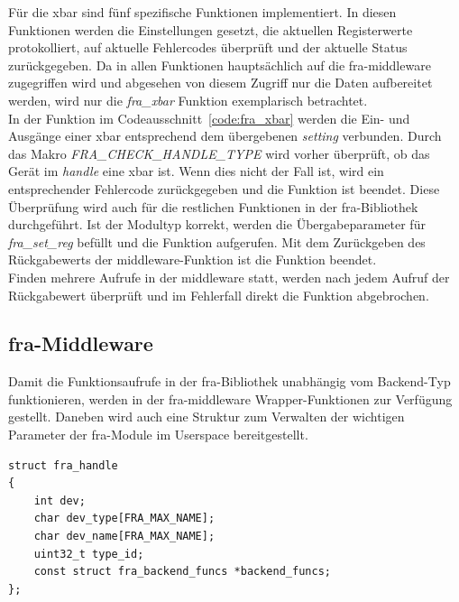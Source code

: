 Für die \ac{xbar} sind fünf spezifische Funktionen implementiert. In diesen Funktionen werden die Einstellungen gesetzt, die aktuellen Registerwerte protokolliert, auf aktuelle Fehlercodes überprüft und der aktuelle Status zurückgegeben. Da in allen Funktionen hauptsächlich auf die \ac{fra}-\gls{middleware} zugegriffen wird und abgesehen von diesem Zugriff nur die Daten aufbereitet werden, wird nur die \textit{fra\_xbar} Funktion exemplarisch betrachtet.\\

In der Funktion im Codeausschnitt~\ref{code:fra_xbar} werden die Ein- und Ausgänge einer \ac{xbar} entsprechend dem übergebenen \textit{setting} verbunden.
Durch das Makro \textit{FRA\_CHECK\_HANDLE\_TYPE} wird vorher überprüft, ob das Gerät im \textit{handle} eine \ac{xbar} ist. Wenn dies nicht der Fall ist, wird ein entsprechender Fehlercode zurückgegeben und die Funktion ist beendet. Diese Überprüfung wird auch für die restlichen Funktionen in der \ac{fra}-Bibliothek durchgeführt.
Ist der Modultyp korrekt, werden die Übergabeparameter für \textit{fra\_set\_reg} befüllt und die Funktion aufgerufen. Mit dem Zurückgeben des Rückgabewerts der \gls{middleware}-Funktion ist die Funktion beendet.\\

Finden mehrere Aufrufe in der \gls{middleware} statt, werden nach jedem Aufruf der Rückgabewert überprüft und im Fehlerfall direkt die Funktion abgebrochen.


\subsection{\acs{fra}-Middleware}\label{sec:middleware}
Damit die Funktionsaufrufe in der \ac{fra}-Bibliothek unabhängig vom Backend-Typ funktionieren, werden in der \ac{fra}-\gls{middleware} Wrapper-Funktionen zur Verfügung gestellt. Daneben wird auch eine Struktur zum Verwalten der wichtigen Parameter der \ac{fra}-Module im Userspace bereitgestellt.


\begin{lstfloat}
\begin{lstlisting}
struct fra_handle
{
	int dev;
	char dev_type[FRA_MAX_NAME];
	char dev_name[FRA_MAX_NAME];
	uint32_t type_id;
	const struct fra_backend_funcs *backend_funcs;
};
\end{lstlisting}
\end{lstfloat}

